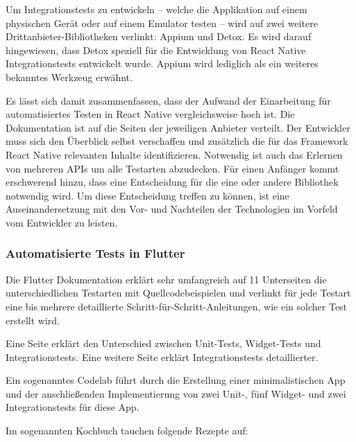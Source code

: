 Um Integrationstests zu entwickeln -- welche die Applikation auf einem physischen Gerät oder auf einem Emulator testen -- wird auf zwei weitere Drittanbieter-Bibliotheken verlinkt: Appium und Detox. Es wird darauf hingewiesen, dass Detox speziell für die Entwicklung von React Native Integrationstests entwickelt wurde. Appium wird lediglich als ein weiteres bekanntes Werkzeug erwähnt.

Es lässt sich damit zusammenfassen, dass der Aufwand der Einarbeitung für automatisiertes Testen in React Native vergleichsweise hoch ist.
Die Dokumentation ist auf die Seiten der jeweiligen Anbieter verteilt.
Der Entwickler muss sich den Überblick selbst verschaffen und zusätzlich die für das Framework React Native relevanten Inhalte identifizieren.
Notwendig ist auch das Erlernen von mehreren APIs um alle Testarten abzudecken.
Für einen Anfänger kommt erschwerend hinzu, dass eine Entscheidung für die eine oder andere Bibliothek notwendig wird.
Um diese Entscheidung treffen zu können, ist eine Auseinandersetzung mit den Vor- und Nachteilen der Technologien im Vorfeld vom Entwickler zu leisten.

\subsubsection{Automatisierte Tests in Flutter} Die Flutter Dokumentation erklärt sehr umfangreich auf 11 Unterseiten die unterschiedlichen Testarten mit Quellcodebeispielen und verlinkt für jede Testart eine bis mehrere detaillierte Schritt-für-Schritt-Anleitungen, wie ein solcher Test erstellt wird.

Eine Seite erklärt den Unterschied zwischen Unit-Tests, Widget-Tests und Integrationstests. Eine weitere Seite erklärt Integrationstests detaillierter.

Ein sogenanntes Codelab führt durch die Erstellung einer minimalistischen App und der anschließenden Implementierung von zwei Unit-, fünf Widget- und zwei Integrationstests für diese App.

Im sogenannten Kochbuch tauchen folgende Rezepte auf:


